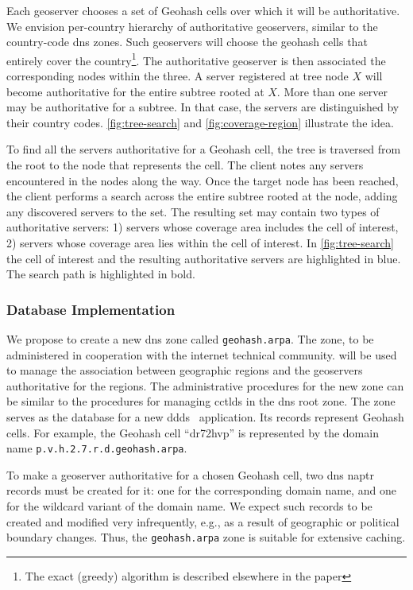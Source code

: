 \documentclass[conference,10pt]{IEEEtran}
\begin{document}
Each geoserver chooses a set of Geohash cells over which it will be authoritative. We envision per-country hierarchy of authoritative geoservers, similar to the country-code \gls{dns} zones. Such geoservers will choose the geohash cells that entirely cover the country\footnote{The exact (greedy) algorithm is described elsewhere in the paper}. The authoritative geoserver is then associated the corresponding nodes within the three. A server registered at tree node $X$ will become authoritative for the entire subtree rooted at $X$. More than one server may be authoritative for a subtree. In that case, the servers are distinguished by their country codes. \cref{fig:tree-search} and \cref{fig:coverage-region} illustrate the idea.

To find all the servers authoritative for a Geohash cell, the tree is traversed from the root to the node that represents the cell. The client notes any servers encountered in the nodes along the way. Once the target node has been reached, the client performs a search across the entire subtree rooted at the node, adding any discovered servers to the set. The resulting set may contain two types of authoritative servers: 1) servers whose coverage area includes the cell of interest, 2) servers whose coverage area lies within the cell of interest. In \cref{fig:tree-search} the cell of interest and the resulting authoritative servers are highlighted in blue. The search path is highlighted in bold.

\subsubsection{Database Implementation}\label{sec:database-implementation}

We propose to create a new \gls{dns} zone called \texttt{geohash.arpa}. The zone, to be administered in cooperation with the internet technical community. will be used to manage the association between geographic regions and the geoservers authoritative for the regions. The administrative procedures for the new zone can be similar to the procedures for managing \glspl{cctld} in the \gls{dns} root zone. The zone serves as the database for a new \gls{ddds}~\cite{rfc3401} application. Its records represent Geohash cells. For example, the Geohash cell ``dr72hvp'' is represented by the domain name \texttt{p.v.h.2.7.r.d.geohash.arpa}.

To make a geoserver authoritative for a chosen Geohash cell, two \gls{dns} \gls{naptr}~\cite{rfc3403} records must be created for it: one for the corresponding domain name, and one for the wildcard variant of the domain name. We expect such records to be created and modified very infrequently, e.g., as a result of geographic or political boundary changes. Thus, the \texttt{geohash.arpa} zone is suitable for extensive caching.
\end{document}
